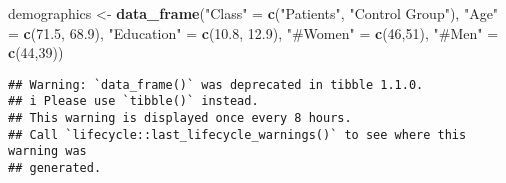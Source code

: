 \documentclass[
]{article}
\newenvironment{Shaded}{\begin{snugshade}}{\end{snugshade}}
\newcommand{\DecValTok}[1]{\textcolor[rgb]{0.00,0.00,0.81}{#1}}
\newcommand{\FloatTok}[1]{\textcolor[rgb]{0.00,0.00,0.81}{#1}}
\newcommand{\FunctionTok}[1]{\textcolor[rgb]{0.13,0.29,0.53}{\textbf{#1}}}
\newcommand{\NormalTok}[1]{#1}
\newcommand{\OtherTok}[1]{\textcolor[rgb]{0.56,0.35,0.01}{#1}}
\newcommand{\StringTok}[1]{\textcolor[rgb]{0.31,0.60,0.02}{#1}}
\begin{document}
\begin{Shaded}
\begin{Highlighting}[]
\NormalTok{demographics }\OtherTok{\textless{}{-}} \FunctionTok{data\_frame}\NormalTok{(}\StringTok{"Class"} \OtherTok{=} \FunctionTok{c}\NormalTok{(}\StringTok{"Patients"}\NormalTok{, }\StringTok{"Control Group"}\NormalTok{), }\StringTok{"Age"} \OtherTok{=} \FunctionTok{c}\NormalTok{(}\FloatTok{71.5}\NormalTok{, }\FloatTok{68.9}\NormalTok{), }\StringTok{"Education"} \OtherTok{=} \FunctionTok{c}\NormalTok{(}\FloatTok{10.8}\NormalTok{, }\FloatTok{12.9}\NormalTok{), }\StringTok{"\#Women"} \OtherTok{=} \FunctionTok{c}\NormalTok{(}\DecValTok{46}\NormalTok{,}\DecValTok{51}\NormalTok{), }\StringTok{"\#Men"} \OtherTok{=} \FunctionTok{c}\NormalTok{(}\DecValTok{44}\NormalTok{,}\DecValTok{39}\NormalTok{))}
\end{Highlighting}
\end{Shaded}

\begin{verbatim}
## Warning: `data_frame()` was deprecated in tibble 1.1.0.
## i Please use `tibble()` instead.
## This warning is displayed once every 8 hours.
## Call `lifecycle::last_lifecycle_warnings()` to see where this warning was
## generated.
\end{verbatim}
\end{document}
